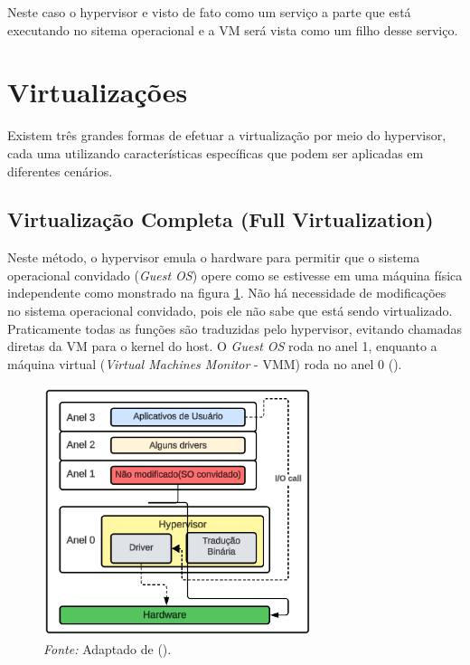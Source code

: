 Neste caso o hypervisor e visto de fato como um serviço a parte que está executando no sitema operacional e a VM será vista como um filho desse serviço.


\section{Virtualizações}

Existem três grandes formas de efetuar a virtualização por meio do hypervisor, cada uma utilizando características específicas que podem ser aplicadas em diferentes cenários.

\subsection{Virtualização Completa (Full Virtualization)}

Neste método, o hypervisor emula o hardware para permitir que o sistema operacional convidado (\textit{Guest OS}) opere como se estivesse em uma máquina física independente como monstrado na figura \ref{fig:full_virtualization_rings}. Não há necessidade de modificações no sistema operacional convidado, pois ele não sabe que está sendo virtualizado. Praticamente todas as funções são traduzidas pelo hypervisor, evitando chamadas diretas da VM para o kernel do host. O \textit{Guest OS} roda no anel 1, enquanto a máquina virtual (\textit{Virtual Machines Monitor} - VMM) roda no anel 0 (\cite{chirammal2016mastering}).

\begin{figure}[htbp]
  \centering
  \caption{Virtualização completa nos anéis de segurança. A figura demonstra o \textit{Guest OS} operando no anel 1 e o VMM no anel 0, com o hypervisor realizando a emulação.}
  \includegraphics[width=0.7\textwidth]{images/full_virtualization_rings.png}
  \caption*{\textit{Fonte:} Adaptado de (\cite{chirammal2016mastering}).}
  \label{fig:full_virtualization_rings}
\end{figure}


